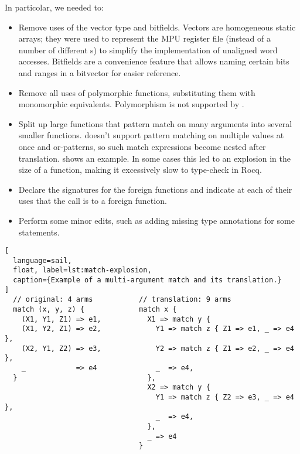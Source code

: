 In particolar, we needed to:
\begin{itemize}
\item Remove uses of the vector type and bitfields. Vectors are homogeneous static arrays; they were used to represent the MPU register file (instead of a number of different s) to simplify the implementation of unaligned word accesses. Bitfields are a convenience feature that allows naming certain bits and ranges in a bitvector for easier reference.

\item Remove all uses of polymorphic functions, substituting them with monomorphic equivalents. Polymorphism is not supported by \usail.

\item Split up large functions that pattern match on many arguments into several smaller functions. \usail doesn't support pattern matching on multiple values at once and or-patterns, so such match expressions become nested after translation.  shows an example. In some cases this led to an explosion in the size of a \usail function, making it excessively slow to type-check in Rocq.

\item Declare the signatures for the foreign functions and indicate at each of their uses that the call is to a foreign function.

\item Perform some minor edits, such as adding missing type annotations for some statements.
\end{itemize}

\begin{lstlisting}[
  language=sail,
  float, label=lst:match-explosion,
  caption={Example of a multi-argument match and its translation.}
]
  // original: 4 arms           // translation: 9 arms
  match (x, y, z) {             match x {
    (X1, Y1, Z1) => e1,           X1 => match y {
    (X1, Y2, Z1) => e2,             Y1 => match z { Z1 => e1, _ => e4 },
    (X2, Y1, Z2) => e3,             Y2 => match z { Z1 => e2, _ => e4 },
    _            => e4              _  => e4,
  }                               },
                                  X2 => match y {
                                    Y1 => match z { Z2 => e3, _ => e4 },
                                    _  => e4,
                                  },
                                  _ => e4
                                }
\end{lstlisting}

